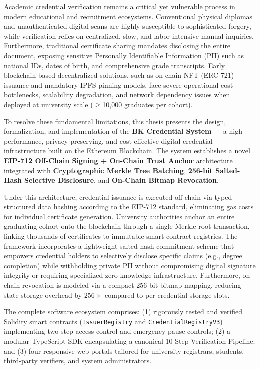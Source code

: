 \documentclass[a4paper,12pt]{report}
\begin{document}

Academic credential verification remains a critical yet vulnerable process in modern educational and recruitment ecosystems. Conventional physical diplomas and unauthenticated digital scans are highly susceptible to sophisticated forgery, while verification relies on centralized, slow, and labor-intensive manual inquiries. Furthermore, traditional certificate sharing mandates disclosing the entire document, exposing sensitive Personally Identifiable Information (PII) such as national IDs, dates of birth, and comprehensive grade transcripts. Early blockchain-based decentralized solutions, such as on-chain NFT (ERC-721) issuance and mandatory IPFS pinning models, face severe operational cost bottlenecks, scalability degradation, and network dependency issues when deployed at university scale ($\geq$10,000 graduates per cohort).

To resolve these fundamental limitations, this thesis presents the design, formalization, and implementation of the \textbf{BK Credential System} --- a high-performance, privacy-preserving, and cost-effective digital credential infrastructure built on the Ethereum Blockchain. The system establishes a novel \textbf{EIP-712 Off-Chain Signing + On-Chain Trust Anchor} architecture integrated with \textbf{Cryptographic Merkle Tree Batching}, \textbf{256-bit Salted-Hash Selective Disclosure}, and \textbf{On-Chain Bitmap Revocation}.

Under this architecture, credential issuance is executed off-chain via typed structured data hashing according to the EIP-712 standard, eliminating gas costs for individual certificate generation. University authorities anchor an entire graduating cohort onto the blockchain through a single Merkle root transaction, linking thousands of certificates to immutable smart contract registries. The framework incorporates a lightweight salted-hash commitment scheme that empowers credential holders to selectively disclose specific claims (e.g., degree completion) while withholding private PII without compromising digital signature integrity or requiring specialized zero-knowledge infrastructure. Furthermore, on-chain revocation is modeled via a compact 256-bit bitmap mapping, reducing state storage overhead by $256\times$ compared to per-credential storage slots.

The complete software ecosystem comprises: (1) rigorously tested and verified Solidity smart contracts (\texttt{IssuerRegistry} and \texttt{CredentialRegistryV3}) implementing two-step access control and emergency pause controls; (2) a modular TypeScript SDK encapsulating a canonical 10-Step Verification Pipeline; and (3) four responsive web portals tailored for university registrars, students, third-party verifiers, and system administrators.
\end{document}
